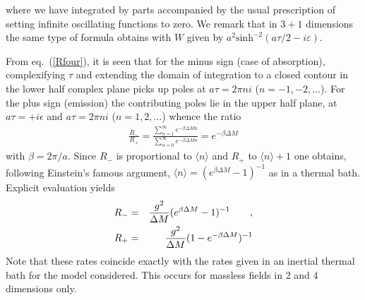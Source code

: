 \documentclass[12pt,oneside]{report}
\begin{document}
where we have integrated by parts accompanied by the usual prescription of
setting infinite oscillating functions to zero.  We
remark that in $3+1$ dimensions the same type of formula obtains with $W$ given
by  $a^2 \mbox{sinh}^{-2}(  a\tau/2 - i \varepsilon) $.
\par From eq.~(\ref{Rfour}), it is seen that for the minus sign (case
of absorption), complexifying $\tau$ and extending the  domain of integration
to a closed contour in the lower half complex plane picks up poles at
$a \tau = 2 \pi ni$ ($n=-1,-2,\ldots$). For the plus sign (emission)
the contributing poles lie in the upper half plane, at $a\tau =
+i\epsilon$ and $a \tau =  2\pi ni$ ($n=1,2,\ldots$) whence the ratio
\begin{eqnarray}
\frac{R_-}{R_+} = 
\frac{\sum^\infty_{n=1} e^{-\beta \Delta M n}}{\sum^\infty_{n=0}
e^{-\beta \Delta M n}} = e^{-\beta \Delta M} \label{Rfive}
\end{eqnarray}
with $\beta = 2\pi/a$. Since $R_-$ is proportional
to $\langle n \rangle$ and $R_+$ to $\langle n \rangle + 1$ one obtains,
following Einstein's famous argument, $\langle n \rangle = (e^{\beta \Delta M}
- 1 )^{-1}$ as in a thermal bath. Explicit evaluation yields 
\begin{eqnarray} R_- &=& {g^2 \over \Delta M}(e^{\beta \Delta M}
-1)^{-1}\qquad ,\nonumber\\ R_+ &=& {g^2 \over \Delta M}(1-e^{-\beta \Delta
M})^{-1} \label{Rfivea}
\end{eqnarray}
Note that these rates
 coincide exactly with the rates given in an inertial thermal bath for
the model considered. This occurs for massless fields
in 2 and 4 dimensions only. 
\end{document}

